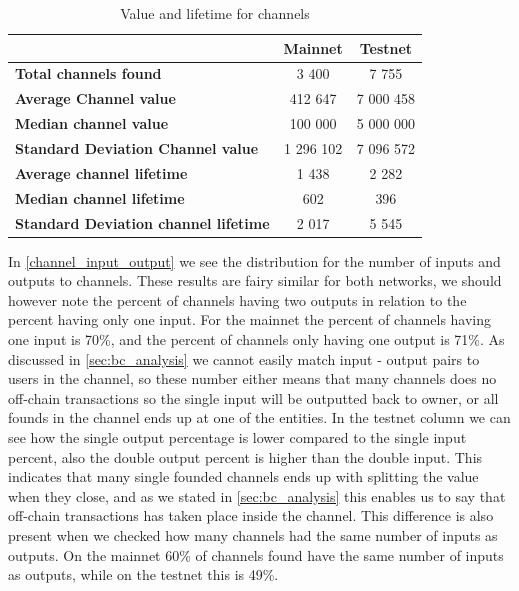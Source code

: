 \begin{table}[]
\centering
\caption{Value and lifetime for channels}
\label{subgraph_stats}
\begin{tabular}{|l|c|c|}
\hline
                                             & \textbf{Mainnet} & \textbf{Testnet} \\ \hline
\textbf{Total channels found}                & 3 400            & 7 755            \\ \hline
\textbf{Average Channel value}               & 412 647          & 7 000 458        \\ \hline
\textbf{Median channel value}                & 100 000          & 5 000 000        \\ \hline
\textbf{Standard Deviation Channel value}    & 1 296 102        & 7 096 572        \\ \hline
\textbf{Average channel lifetime}            & 1 438            & 2 282            \\ \hline
\textbf{Median channel lifetime}             & 602              & 396              \\ \hline
\textbf{Standard Deviation channel lifetime} & 2 017            & 5 545            \\ \hline
\end{tabular}
\end{table}

In \cref{channel_input_output} we see the distribution for the number of inputs and outputs to channels. These results are fairy similar for both networks, we should however note the percent of channels having two outputs in relation to the percent having only one input. For the mainnet the percent of channels having one input is 70\%, and the percent of channels only having one output is 71\%. As discussed in \cref{sec:bc_analysis} we cannot easily match input - output pairs to users in the channel, so these number either means that many channels does no off-chain transactions so the single input will be outputted back to owner, or all founds in the channel ends up at one of the entities. In the testnet column we can see how the single output percentage is lower compared to the single input percent, also the double output percent is higher than the double input. This indicates that many single founded channels ends up with splitting the value when they close, and as we stated in \cref{sec:bc_analysis} this enables us to say that off-chain transactions has taken place inside the channel.
This difference is also present when we checked how many channels had the same number of inputs as outputs. On the mainnet 60\% of channels found have the same number of inputs as outputs, while on the testnet this is 49\%. 

